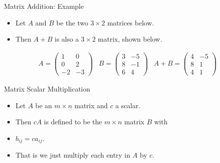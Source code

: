 \documentclass{beamer}
\begin{document}
\begin{frame}{Matrix Addition: Example}

\begin{itemize}
\item Let $A$ and $B$ be the two $3\times 2$ matrices below.
\item Then $A+B$ is also a $3\times 2$ matrix, shown below.
\end{itemize}

$$
\begin{matrix}
A =

\begin{pmatrix}
1 & 0 \\
0 & 2 \\
-2 & -3
\end{pmatrix}

&

B =

\begin{pmatrix}
3 & -5 \\
8 & -1 \\
6 & 4
\end{pmatrix}

&

A + B =

\begin{pmatrix}
4 & -5 \\
8 & 1 \\
4 & 1
\end{pmatrix}

\end{matrix}
$$

\end{frame}


\begin{frame}{Matrix Scalar Multiplication}

\begin{itemize}
\item Let $A$ be an $m\times n$ matrix and $c$ a scalar.
\item Then $cA$ is defined to be the $m\times n$ matrix $B$ with
\item $b_{ij} = c a_{ij}$.
\item That is we just multiply each entry in $A$ by $c$.
\end{itemize}

\end{frame}


\end{document}
